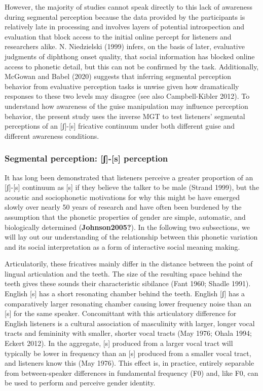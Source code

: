 \documentclass[
  letterpaper,
  DIV=11,
  numbers=noendperiod]{scrartcl}
\begin{document}
However, the majority of studies cannot speak directly to this lack of
awareness during segmental perception because the data provided by the
participants is relatively late in processing and involves layers of
potential introspection and evaluation that block access to the initial
online percept for listeners and researchers alike. N. Niedzielski
(1999) infers, on the basis of later, evaluative judgments of diphthong
onset quality, that social information has blocked online access to
phonetic detail, but this can not be confirmed by the task.
Additionally, McGowan and Babel (2020) suggests that inferring segmental
perception behavior from evaluative perception tasks is unwise given how
dramatically responses to these two levels may disagree (see also
Campbell-Kibler 2012). To understand how awareness of the guise
manipulation may influence perception behavior, the present study uses
the inverse MGT to test listeners' segmental perceptions of an
{[}ʃ{]}-{[}s{]} fricative continuum under both different guise and
different awareness conditions.

\subsubsection{Segmental perception: {[}ʃ{]}-{[}s{]}
perception}\label{sub-fricative-gender}

It has long been demonstrated that listeners perceive a greater
proportion of an {[}ʃ{]}-{[}s{]} continuum as {[}s{]} if they believe
the talker to be male (Strand 1999), but the acoustic and sociophonetic
motivations for why this might be have emerged slowly over nearly 50
years of research and have often been burdened by the assumption that
the phonetic properties of gender are simple, automatic, and
biologically determined (\textbf{Johnson2005?}). In the following two
subsections, we will lay out our understanding of the relationship
between this phonetic variation and its social interpretation as a form
of interactive social meaning making.

Articulatorily, these fricatives mainly differ in the distance between
the point of lingual articulation and the teeth. The size of the
resulting space behind the teeth gives these sounds their characteristic
sibilance (Fant 1960; Shadle 1991). English {[}s{]} has a short
resonating chamber behind the teeth. English {[}ʃ{]} has a comparatively
larger resonating chamber causing lower frequency noise than an {[}s{]}
for the same speaker. Concomittant with this articulatory difference for
English listeners is a cultural association of masculinity with larger,
longer vocal tracts and femininity with smaller, shorter vocal tracts
(May 1976; Ohala 1994; Eckert 2012). In the aggregate, {[}s{]} produced
from a larger vocal tract will typically be lower in frequency than an
{[}s{]} produced from a smaller vocal tract, and listeners know this
(May 1976). This effect is, in practice, entirely separable from
between-speaker differences in fundamental frequency (F0) and, like F0,
can be used to perform and perceive gender identity.
\end{document}
